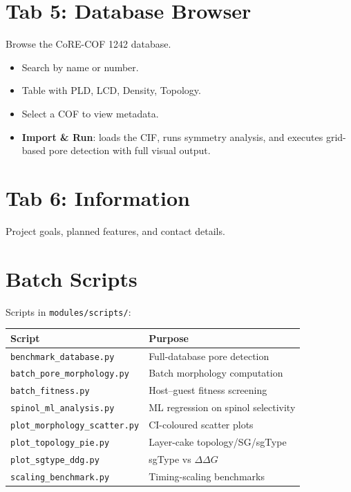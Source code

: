 \documentclass[11pt,a4paper]{article}
\begin{document}
\section{Tab 5: Database Browser}

Browse the CoRE-COF 1242 database.

\begin{itemize}
    \item Search by name or number.
    \item Table with PLD, LCD, Density, Topology.
    \item Select a COF to view metadata.
    \item \textbf{Import \& Run}: loads the CIF, runs symmetry analysis,
          and executes grid-based pore detection with full visual output.
\end{itemize}

\section{Tab 6: Information}

Project goals, planned features, and contact details.

\section{Batch Scripts}

Scripts in \texttt{modules/scripts/}:

\begin{tabular}{ll}
    \toprule
    Script & Purpose \\
    \midrule
    \texttt{benchmark\_database.py} & Full-database pore detection \\
    \texttt{batch\_pore\_morphology.py} & Batch morphology computation \\
    \texttt{batch\_fitness.py} & Host--guest fitness screening \\
    \texttt{spinol\_ml\_analysis.py} & ML regression on spinol selectivity \\
    \texttt{plot\_morphology\_scatter.py} & CI-coloured scatter plots \\
    \texttt{plot\_topology\_pie.py} & Layer-cake topology/SG/sgType \\
    \texttt{plot\_sgtype\_ddg.py} & sgType vs $\Delta\Delta G$ \\
    \texttt{scaling\_benchmark.py} & Timing-scaling benchmarks \\
    \bottomrule
\end{tabular}
\end{document}
